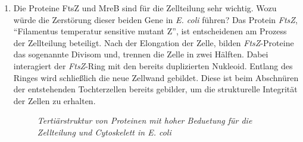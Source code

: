 \begin{enumerate}
	\item Die Proteine FtsZ und MreB sind für die Zellteilung sehr wichtig. Wozu würde die Zerstörung dieser beiden Gene in \emph{E. coli} führen?
		Das Protein \emph{FtsZ}, ``Filamentus temperatur sensitive mutant Z'',
		ist entscheidenen am Prozess der Zellteilung beteiligt.
		Nach der Elongation der Zelle,
		bilden \emph{FtsZ}-Proteine das sogenannte Divisom und,
		trennen die Zelle in zwei Hälften.
		Dabei interagiert der \emph{FtsZ}-Ring mit den bereits duplizierten Nukleoid.
		Entlang des Ringes wird schließlich die neue Zellwand gebildet.
		Diese ist beim Abschnüren der entstehenden Tochterzellen bereits gebilder,
		um die strukturelle Integrität der Zellen zu erhalten.	%

		\begin{figure}
		\centering
		\caption{\slshape{Tertiärstruktur von Proteinen mit hoher Beduetung für die Zellteilung und Cytoskelett in \emph{E. coli}}}
		\label{fig:ecoli_proteins}
		\end{figure}


\end{enumerate}
